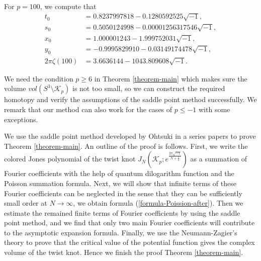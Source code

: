\documentclass[12pt]{amsart}
\begin{document}
\begin{example}
    For $p=100$, we compute that 
    \begin{align}
           t_0&=0.8237997818-0.1280592525\sqrt{-1}, \\\nonumber
           s_0&=0.5050124998-0.00001256317546\sqrt{-1}, \\\nonumber
           x_0&=1.000001243-1.999752031\sqrt{-1}, \\\nonumber
           y_0&=-0.9995829910-0.03149174478\sqrt{-1}, \\\nonumber
           2\pi \zeta(100)&=3.6636144-1043.809608\sqrt{-1}.
    \end{align}
\end{example}
\begin{remark}
    We need the condition $p\geq 6$ in Theorem \ref{theorem-main} which makes sure the volume $vol(S^3\setminus \mathcal{K}_p)$ is not too small, so we can construct the required homotopy and verify the assumptions of the saddle point method successfully. We remark that our method can also work for the cases of $p\leq -1$ with some exceptions.     
\end{remark}



We use the saddle point method developed by Ohtsuki in a series papers  \cite{Oht16,  Oht17, Oht18, OhtYok18}  to prove Theorem \ref{theorem-main}.   An outline of the proof is follows.  First, we write the colored Jones polynomial of the twist knot $J_N(\mathcal{K}_p;e^{\frac{2\pi\sqrt{-1}}{N+\frac{1}{2}}})$  as a summation of Fourier coefficients with the help of  quantum dilogarithm function and the Poisson summation formula. Next, we will show that infinite terms of these Fourier coefficients can be neglected in the sense that they can be sufficiently small order at $N\rightarrow \infty$, we obtain formula (\ref{formula-Poission-after}). Then we estimate the remained finite terms of Fourier coefficients by using the saddle point method, and we find that only two main Fourier coefficients will contribute to the asymptotic expansion formula. Finally, we use the Neumann-Zagier's theory to prove that the critical value of the potential function gives the complex volume of the twist knot.  Hence we finish the proof Theorem \ref{theorem-main}. 
\end{document}
